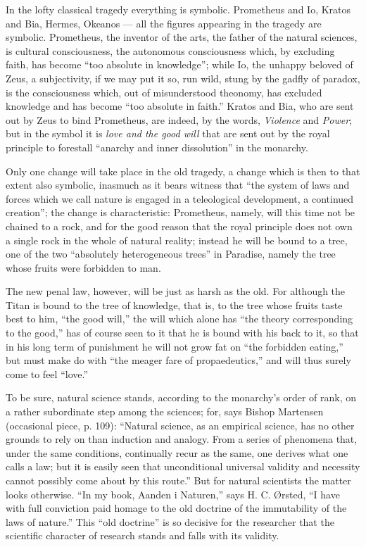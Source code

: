 \documentclass[12pt]{book}
\newcommand{\opage}[1]{\marginnote{\footnotesize\textit{[#1]}}}
\begin{document}
In the lofty classical tragedy everything is symbolic. Prometheus and Io, Kratos and Bia, Hermes, Okeanos --- all the figures appearing in the tragedy are symbolic. Prometheus, the inventor of the arts, the father of the natural sciences, is cultural consciousness, the autonomous consciousness which, by excluding faith, has become ``too absolute in knowledge''; while Io, the unhappy beloved of Zeus, a subjectivity, if we may put it so, run wild, stung by the gadfly of paradox, is the consciousness which, out of misunderstood theonomy, has excluded knowledge and has become ``too absolute in faith.'' Kratos and Bia, who are sent out by Zeus to bind Prometheus, are indeed, by the words, \emph{Violence} and \emph{Power}; but in the symbol it is \emph{love and the good will} that are sent out by the royal principle to forestall ``anarchy and inner dissolution'' in the monarchy.

Only one change will take place in the old tragedy, a change which is then to that extent also symbolic, inasmuch as it bears witness that ``the system of laws
\opage{18}\setcounter{footnote}{0}%
and forces which we call nature is engaged in a teleological development, a continued creation''; the change is characteristic: Prometheus, namely, will this time not be chained to a rock, and for the good reason that the royal principle does not own a single rock in the whole of natural reality; instead he will be bound to a tree, one of the two ``absolutely heterogeneous trees'' in Paradise, namely the tree whose fruits were forbidden to man.

The new penal law, however, will be just as harsh as the old. For although the Titan is bound to the tree of knowledge, that is, to the tree whose fruits taste best to him, ``the good will,'' the will which alone has ``the theory corresponding to the good,'' has of course seen to it that he is bound with his back to it, so that in his long term of punishment he will not grow fat on ``the forbidden eating,'' but must make do with ``the meager fare of propaedeutics,'' and will thus surely come to feel ``love.''

To be sure, natural science stands, according to the monarchy's order of rank, on a rather subordinate step among the sciences; for, says Bishop Martensen (occasional piece, p. 109): ``Natural science, as an empirical science, has no other grounds to rely on than induction and analogy. From a series of phenomena that, under the same conditions, continually recur as the same, one derives what one calls a law; but it is easily seen that unconditional universal validity and necessity cannot possibly come about by this route.'' But for natural scientists the matter looks otherwise. ``In my book, Aanden i Naturen,'' says H. C. Ørsted, ``I have with full conviction paid homage to the old doctrine of the immutability of the laws of nature.'' This ``old doctrine'' is so decisive for the researcher that the scientific character of research stands and falls with its validity.
\end{document}
